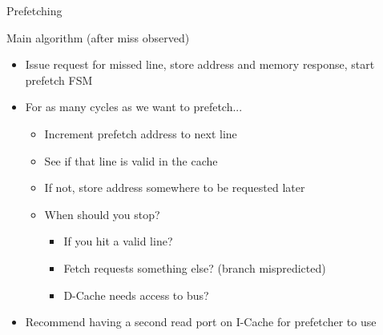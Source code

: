 \documentclass[table,dvipsnames]{beamer}
\begin{document}
\begin{frame}[fragile]{Prefetching}
	\begin{block}{Main algorithm (after miss observed)}
	\begin{itemize}
		\item Issue request for missed line, store address and memory response, start prefetch FSM
		\item For as many cycles as we want to prefetch...
		\begin{itemize} \item Increment prefetch address to next line
			\item See if that line is valid in the cache
			\item If not, store address somewhere to be requested later
			\item When should you stop?
			\begin{itemize} \item If you hit a valid line?
				\item Fetch requests something else? (branch mispredicted)
				\item D-Cache needs access to bus?
			\end{itemize}
		\end{itemize}
	\item Recommend having a second read port on I-Cache for prefetcher to use
	\end{itemize}

	\end{block}	
\end{frame}
\end{document}
